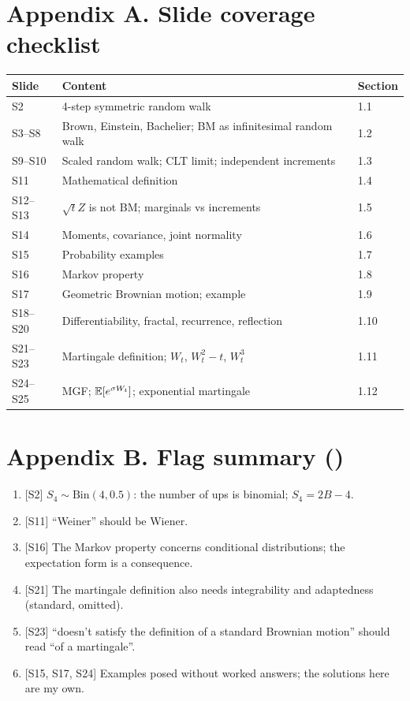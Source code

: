 \documentclass[10pt]{article}
\begin{document}
\section*{Appendix A. Slide coverage checklist}
{\small\begin{tabularx}{\linewidth}{@{}l X l@{}}\toprule
Slide & Content & Section\\\midrule
S2 & 4-step symmetric random walk & 1.1\\
S3--S8 & Brown, Einstein, Bachelier; BM as infinitesimal random walk & 1.2\\
S9--S10 & Scaled random walk; CLT limit; independent increments & 1.3\\
S11 & Mathematical definition & 1.4\\
S12--S13 & $\sqrt tZ$ is not BM; marginals vs increments & 1.5\\
S14 & Moments, covariance, joint normality & 1.6\\
S15 & Probability examples & 1.7\\
S16 & Markov property & 1.8\\
S17 & Geometric Brownian motion; example & 1.9\\
S18--S20 & Differentiability, fractal, recurrence, reflection & 1.10\\
S21--S23 & Martingale definition; $W_t$, $W_t^2-t$, $W_t^3$ & 1.11\\
S24--S25 & MGF; $\mathbb{E}[e^{\sigma W_t}]$; exponential martingale & 1.12\\\bottomrule
\end{tabularx}}

\section*{Appendix B. Flag summary (\flag)}
\begin{enumerate}
\item {}[S2] $S_4\sim\mathrm{Bin}(4,0.5)$: the number of ups is binomial; $S_4=2B-4$.
\item {}[S11] ``Weiner'' should be Wiener.
\item {}[S16] The Markov property concerns conditional distributions; the expectation form is a consequence.
\item {}[S21] The martingale definition also needs integrability and adaptedness (standard, omitted).
\item {}[S23] ``doesn't satisfy the definition of a standard Brownian motion'' should read ``of a martingale''.
\item {}[S15, S17, S24] Examples posed without worked answers; the solutions here are my own.
\end{enumerate}
\end{document}

